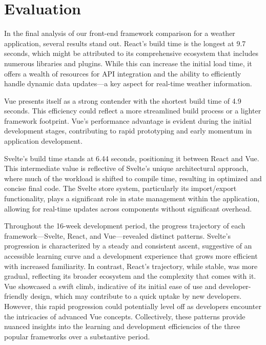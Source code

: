 \section{Evaluation}

In the final analysis of our front-end framework comparison for a weather application, several results stand out. React's build time is the longest at 9.7 seconds, which might be attributed to its comprehensive ecosystem that includes numerous libraries and plugins. While this can increase the initial load time, it offers a wealth of resources for API integration and the ability to efficiently handle dynamic data updates—a key aspect for real-time weather information.

Vue presents itself as a strong contender with the shortest build time of 4.9 seconds. This efficiency could reflect a more streamlined build process or a lighter framework footprint. Vue's performance advantage is evident during the initial development stages, contributing to rapid prototyping and early momentum in application development.

Svelte's build time stands at 6.44 seconds, positioning it between React and Vue. This intermediate value is reflective of Svelte's unique architectural approach, where much of the workload is shifted to compile time, resulting in optimized and concise final code. The Svelte store system, particularly its import/export functionality, plays a significant role in state management within the application, allowing for real-time updates across components without significant overhead.

Throughout the 16-week development period, the progress trajectory of each framework—Svelte, React, and Vue—revealed distinct patterns. Svelte's progression is characterized by a steady and consistent ascent, suggestive of an accessible learning curve and a development experience that grows more efficient with increased familiarity. In contrast, React's trajectory, while stable, was more gradual, reflecting its broader ecosystem and the complexity that comes with it. Vue showcased a swift climb, indicative of its initial ease of use and developer-friendly design, which may contribute to a quick uptake by new developers. However, this rapid progression could potentially level off as developers encounter the intricacies of advanced Vue concepts. Collectively, these patterns provide nuanced insights into the learning and development efficiencies of the three popular frameworks over a substantive period.

